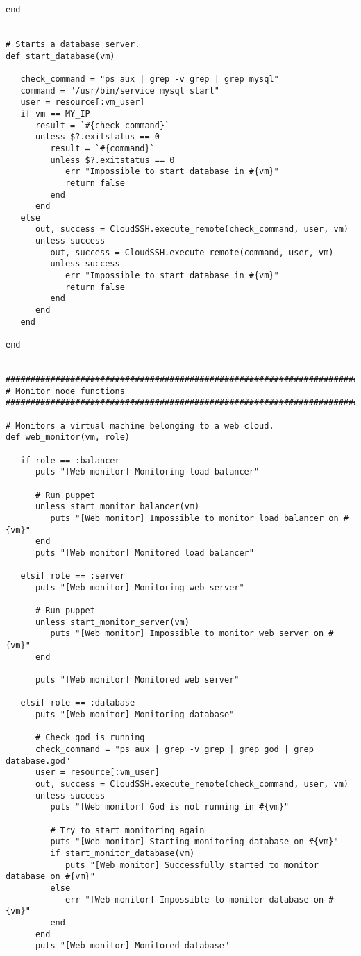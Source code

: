 \begin{lstlisting}
end


# Starts a database server.
def start_database(vm)
   
   check_command = "ps aux | grep -v grep | grep mysql"
   command = "/usr/bin/service mysql start"
   user = resource[:vm_user]
   if vm == MY_IP
      result = `#{check_command}`
      unless $?.exitstatus == 0
         result = `#{command}`
         unless $?.exitstatus == 0
            err "Impossible to start database in #{vm}"
            return false
         end
      end
   else
      out, success = CloudSSH.execute_remote(check_command, user, vm)
      unless success
         out, success = CloudSSH.execute_remote(command, user, vm)
         unless success
            err "Impossible to start database in #{vm}"
            return false
         end
      end
   end
   
end


################################################################################
# Monitor node functions
################################################################################

# Monitors a virtual machine belonging to a web cloud.
def web_monitor(vm, role)

   if role == :balancer
      puts "[Web monitor] Monitoring load balancer"
      
      # Run puppet
      unless start_monitor_balancer(vm)
         puts "[Web monitor] Impossible to monitor load balancer on #{vm}"
      end
      puts "[Web monitor] Monitored load balancer"

   elsif role == :server
      puts "[Web monitor] Monitoring web server"
      
      # Run puppet
      unless start_monitor_server(vm)
         puts "[Web monitor] Impossible to monitor web server on #{vm}"
      end
      
      puts "[Web monitor] Monitored web server"
      
   elsif role == :database
      puts "[Web monitor] Monitoring database"
      
      # Check god is running
      check_command = "ps aux | grep -v grep | grep god | grep database.god"
      user = resource[:vm_user]
      out, success = CloudSSH.execute_remote(check_command, user, vm)
      unless success
         puts "[Web monitor] God is not running in #{vm}"
         
         # Try to start monitoring again
         puts "[Web monitor] Starting monitoring database on #{vm}"
         if start_monitor_database(vm)
            puts "[Web monitor] Successfully started to monitor database on #{vm}"
         else
            err "[Web monitor] Impossible to monitor database on #{vm}"
         end
      end
      puts "[Web monitor] Monitored database"


\end{lstlisting}
